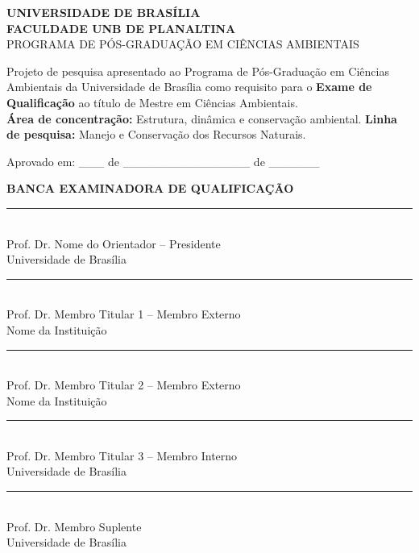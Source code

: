 \documentclass[
  12pt,
  openany,   %
  oneside,   %
  a4paper,
  english, brazil, sumario=tradicional
]{abntex2}
\newcommand{\titulobanca}{BANCA EXAMINADORA DE QUALIFICAÇÃO}
\newcommand{\naturezatrabalho}{%
      Projeto de pesquisa apresentado ao Programa de
      Pós-Graduação em Ciências Ambientais da Universidade
      de Brasília como requisito para o \textbf{Exame de
      Qualificação} ao título de Mestre em Ciências Ambientais.}
\newcommand{\titulobanca}{BANCA EXAMINADORA DE QUALIFICAÇÃO}
\newcommand{\naturezatrabalho}{%
      Projeto de pesquisa apresentado ao Programa de
      Pós-Graduação em Ciências Ambientais da Universidade
      de Brasília como requisito para o \textbf{Exame de
      Qualificação} ao título de Doutor em Ciências Ambientais.}
\newcommand{\titulobanca}{BANCA EXAMINADORA}
\newcommand{\naturezatrabalho}{%
      Dissertação apresentada ao Programa de Pós-Graduação
      em Ciências Ambientais da Universidade de Brasília
      como requisito para obtenção do título de
      Mestre(a) em Ciências Ambientais.}
\newcommand{\titulobanca}{BANCA EXAMINADORA}
\newcommand{\naturezatrabalho}{%
      Tese apresentada ao Programa de Pós-Graduação
      em Ciências Ambientais da Universidade de Brasília
      como requisito para obtenção do título de
      Doutor(a) em Ciências Ambientais.}
\newcommand{\areaConcentracao}{Estrutura, dinâmica e conservação ambiental}
\newcommand{\linhaPesquisa}{Manejo e Conservação dos Recursos Naturais}
\newcommand{\bancaPresidente}{Prof. Dr. Nome do Orientador -- Presidente\\Universidade de Brasília}
\newcommand{\bancaTitularI}{Prof. Dr. Membro Titular 1 -- Membro Externo\\Nome da Instituição}
\newcommand{\bancaTitularII}{Prof. Dr. Membro Titular 2 -- Membro Externo\\Nome da Instituição}
\newcommand{\bancaTitularIII}{Prof. Dr. Membro Titular 3 -- Membro Interno\\Universidade de Brasília}
\newcommand{\bancaSuplente}{Prof. Dr. Membro Suplente\\Universidade de Brasília}
\newcommand{\dataAprovacao}{\_\_\_ de \_\_\_\_\_\_\_\_\_\_\_\_\_\_\_ de \_\_\_\_\_\_}
\begin{document}
\begin{folhadeaprovacao}
  \begin{center}
    {\large\bfseries UNIVERSIDADE DE BRAS\'ILIA}\\
    {\large\bfseries FACULDADE UNB DE PLANALTINA}\\
    {\normalsize PROGRAMA DE P\'OS-GRADUA\c{C}\~AO EM CI\^ENCIAS AMBIENTAIS}
    \vspace{0.8cm}

    {\large\imprimirautor}
    \vspace{0.8cm}

    {\large\bfseries\MakeUppercase{\imprimirtitulo}}
    \vspace{0.5cm}

    \hspace{.45\textwidth}
    \begin{minipage}{.5\textwidth}
      \SingleSpacing\small
      \naturezatrabalho\\[0.3cm]
      \textbf{Área de concentração:} \areaConcentracao.
      \textbf{Linha de pesquisa:} \linhaPesquisa.
    \end{minipage}
  \end{center}

  \vspace{0.5cm}
  \noindent Aprovado em: \dataAprovacao

  \vspace{0.5cm}
  \begin{center}
  \noindent\textbf{\titulobanca}

  \vspace{0.8cm}
  \rule{8cm}{0.4pt}\\[2pt]
  \bancaPresidente

  \vspace{0.8cm}
  \rule{8cm}{0.4pt}\\[2pt]
  \bancaTitularI

  \vspace{0.8cm}
  \rule{8cm}{0.4pt}\\[2pt]
  \bancaTitularII

  \vspace{0.8cm}
  \rule{8cm}{0.4pt}\\[2pt]
  \bancaTitularIII

  \vspace{0.8cm}
  \rule{8cm}{0.4pt}\\[2pt]
  \bancaSuplente
  \end{center}
\end{folhadeaprovacao}
\end{document}
